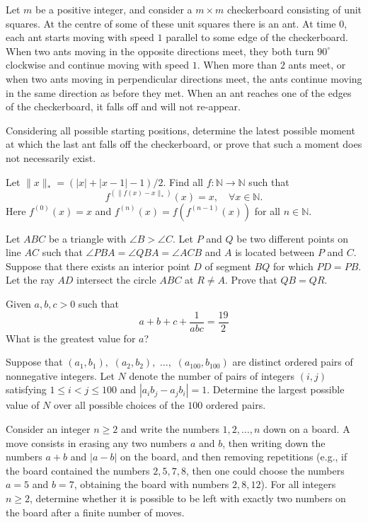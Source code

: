 \documentclass[11pt]{scrartcl}
\begin{document}
\begin{problem}[2358076615453535648]
Let $m$ be a positive integer, and consider a $m\times m$ checkerboard consisting of unit squares. At the centre of some of these unit squares there is an ant. At time $0$, each ant starts moving with speed $1$ parallel to some edge of the checkerboard. When two ants moving in the opposite directions meet, they both turn $90^{\circ}$ clockwise and continue moving with speed $1$. When more than $2$ ants meet, or when two ants moving in perpendicular directions meet, the ants continue moving in the same direction as before they met. When an ant reaches one of the edges of the checkerboard, it falls off and will not re-appear.

Considering all possible starting positions, determine the latest possible moment at which the last ant falls off the checkerboard, or prove that such a moment does not necessarily exist.
\end{problem}
\begin{problem}[2442107022588075509]
Let $\|x\|_*=(|x|+|x-1|-1)/2$. Find all $f:\mathbb{N}\to\mathbb{N}$ such that
\[f^{(\|f(x)-x\|_*)}(x)=x, \quad\forall x\in\mathbb{N}.\]Here $f^{(0)}(x)=x$ and $f^{(n)}(x)=f(f^{(n-1)}(x))$ for all $n\in\mathbb{N}$.
\end{problem}
\begin{problem}[2477568457295629780]
	Let $ABC$ be a triangle with $\angle B > \angle C$. Let $P$ and $Q$ be two different points on line $AC$ such that $\angle PBA = \angle QBA = \angle ACB $ and $A$ is located between $P$ and $C$. Suppose that there exists an interior point $D$ of segment $BQ$ for which $PD=PB$. Let the ray $AD$ intersect the circle $ABC$ at $R \neq A$. Prove that $QB = QR$.
\end{problem}
\begin{problem}[2496921517591669744]
Given $a,b,c>0$ such that
$$a+b+c+\frac{1}{abc}=\frac{19}{2}$$
What is the greatest value for $a$?
\end{problem}
\begin{problem}[2556841339462610604]
	Suppose that $(a_1,b_1),$ $(a_2,b_2),$ $\dots,$ $(a_{100},b_{100})$ are distinct ordered pairs of nonnegative integers. Let $N$ denote the number of pairs of integers $(i,j)$ satisfying $1\leq i<j\leq 100$ and $|a_ib_j-a_jb_i|=1$. Determine the largest possible value of $N$ over all possible choices of the $100$ ordered pairs.
\end{problem}
\begin{problem}[2566019241385820279]
	Consider an integer \(n \ge 2\) and write the numbers \(1, 2,  \ldots, n\) down on a board. A move consists in erasing any two numbers \(a\) and \(b\), then writing down the numbers \(a+b\) and \(\vert a-b \vert\) on the board, and then removing repetitions (e.g., if the board contained the numbers \(2, 5, 7, 8\), then one could choose the numbers \(a = 5\) and \(b = 7\), obtaining the board with numbers \(2, 8, 12\)). For all integers \(n \ge 2\), determine whether it is possible to be left with exactly two numbers on the board after a finite number of moves.
\end{problem}
\end{document}
